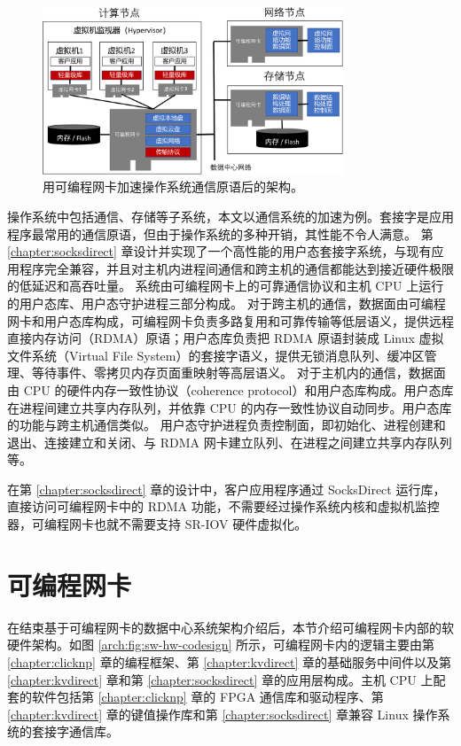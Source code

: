 \begin{figure}[htbp]
	\centering
	\includegraphics[width=0.8\textwidth]{figures/os_primitives_accel.pdf}
	\caption{用可编程网卡加速操作系统通信原语后的架构。}
	\label{arch:fig:os-primitives-accel}
\end{figure}

操作系统中包括通信、存储等子系统，本文以通信系统的加速为例。套接字是应用程序最常用的通信原语，但由于操作系统的多种开销，其性能不令人满意。
第 \ref{chapter:socksdirect} 章设计并实现了一个高性能的用户态套接字系统，与现有应用程序完全兼容，并且对主机内进程间通信和跨主机的通信都能达到接近硬件极限的低延迟和高吞吐量。
系统由可编程网卡上的可靠通信协议和主机 CPU 上运行的用户态库、用户态守护进程三部分构成。
对于跨主机的通信，数据面由可编程网卡和用户态库构成，可编程网卡负责多路复用和可靠传输等低层语义，提供远程直接内存访问（RDMA）原语；用户态库负责把 RDMA 原语封装成 Linux 虚拟文件系统（Virtual File System）的套接字语义，提供无锁消息队列、缓冲区管理、等待事件、零拷贝内存页面重映射等高层语义。
对于主机内的通信，数据面由 CPU 的硬件内存一致性协议（coherence protocol）和用户态库构成。用户态库在进程间建立共享内存队列，并依靠 CPU 的内存一致性协议自动同步。用户态库的功能与跨主机通信类似。
用户态守护进程负责控制面，即初始化、进程创建和退出、连接建立和关闭、与 RDMA 网卡建立队列、在进程之间建立共享内存队列等。

在第 \ref{chapter:socksdirect} 章的设计中，客户应用程序通过 SocksDirect 运行库，直接访问可编程网卡中的 RDMA 功能，不需要经过操作系统内核和虚拟机监控器，可编程网卡也就不需要支持 SR-IOV 硬件虚拟化。



\section{可编程网卡}

在结束基于可编程网卡的数据中心系统架构介绍后，本节介绍可编程网卡内部的软硬件架构。如图 \ref{arch:fig:sw-hw-codesign} 所示，可编程网卡内的逻辑主要由第 \ref{chapter:clicknp} 章的编程框架、第 \ref{chapter:kvdirect} 章的基础服务中间件以及第 \ref{chapter:kvdirect} 章和第 \ref{chapter:socksdirect} 章的应用层构成。主机 CPU 上配套的软件包括第 \ref{chapter:clicknp} 章的 FPGA 通信库和驱动程序、第 \ref{chapter:kvdirect} 章的键值操作库和第 \ref{chapter:socksdirect} 章兼容 Linux 操作系统的套接字通信库。

